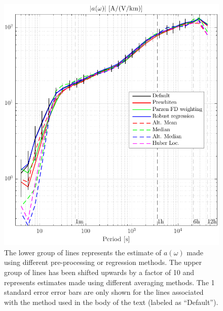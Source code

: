 \documentclass[draft,linenumbers]{agujournal2018}
\begin{document}
\begin{figure}[h]
\centering
\includegraphics[width=\textwidth]{figures/plot_options_comparison_a.pdf}
\caption{The lower group of lines represents the estimate of $a(\omega)$ made using different pre-processing or regression methods. The upper group of lines has been shifted upwards by a factor of 10 and represents estimates made using different averaging methods. The 1 standard error error bars are only shown for the lines associated with the method used in the body of the text (labeled as ``Default'').}
\label{b_variations}
\end{figure}




\end{document}
